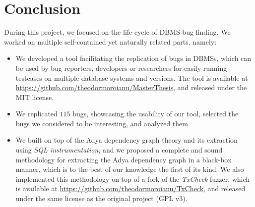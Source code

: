 \chapter{Conclusion}

During this project, we focused on the life-cycle of DBMS bug finding. We worked on multiple self-contained yet naturally related parts, namely:

\begin{itemize}
    \item We developed a tool facilitating the replication of bugs in DBMSs, which can be used by bug reporters, developers or researchers for easily running testcases on multiple database systems and versions. The tool is available at \url{https://github.com/theodormoroianu/MasterThesis}, and released under the MIT license.
    \item We replicated $115$ bugs, showcasing the usability of our tool, selected the bugs we considered to be interesting, and analyzed them. 
    \item We built on top of the Adya dependency graph theory and its extraction using \textit{SQL instrumentation}, and we proposed a complete and sound methodology for extracting the Adya dependency graph in a black-box manner, which is to the best of our knowledge the first of its kind. We also implemented this methodology on top of a fork of the \textit{TxCheck} fuzzer, which is available at \url{https://github.com/theodormoroianu/TxCheck}, and released under the same license as the original project (GPL v3). 
\end{itemize}


